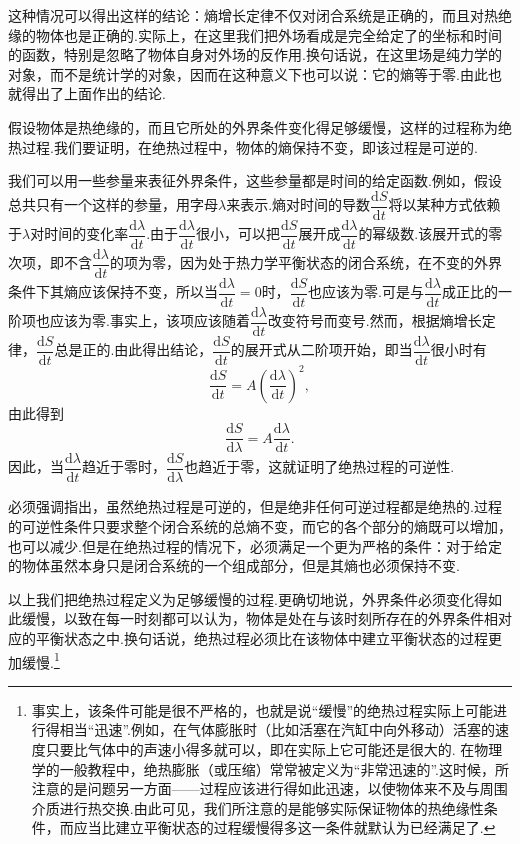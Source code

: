 这种情况可以得出这样的结论：熵增长定律不仅对闭合系统是正确的，而且对热绝缘的物体也是正确的.实际上，在这里我们把外场看成是完全给定了的坐标和时间的函数，特别是忽略了物体自身对外场的反作用.换句话说，在这里场是纯力学的对象，而不是统计学的对象，因而在这种意义下也可以说：它的熵等于零.由此也就得出了上面作出的结论.

假设物体是热绝缘的，而且它所处的外界条件变化得足够缓慢，这样的过程称为绝热过程.我们要证明，在绝热过程中，物体的熵保持不变，即该过程是可逆的.

我们可以用一些参量来表征外界条件，这些参量都是时间的给定函数.例如，假设总共只有一个这样的参量，用字母$\lambda$来表示.熵对时间的导数$\dfrac{\mathrm{d}S}{\mathrm{d}t}$将以某种方式依赖于$\lambda$对时间的变化率$\dfrac{\mathrm{d}\lambda}{\mathrm{d}t}$.由于$\dfrac{\mathrm{d}\lambda}{\mathrm{d}t}$很小，可以把$\dfrac{\mathrm{d}S}{\mathrm{d}t}$展开成$\dfrac{\mathrm{d}\lambda}{\mathrm{d}t}$的幂级数.该展开式的零次项，即不含$\dfrac{\mathrm{d}\lambda}{\mathrm{d}t}$的项为零，因为处于热力学平衡状态的闭合系统，在不变的外界条件下其熵应该保持不变，所以当$\dfrac{\mathrm{d}\lambda}{\mathrm{d}t}=0$时，$\dfrac{\mathrm{d}S}{\mathrm{d}t}$也应该为零.可是与$\dfrac{\mathrm{d}\lambda}{\mathrm{d}t}$成正比的一阶项也应该为零.事实上，该项应该随着$\dfrac{\mathrm{d}\lambda}{\mathrm{d}t}$改变符号而变号.然而，根据熵增长定律，$\dfrac{\mathrm{d}S}{\mathrm{d}t}$总是正的.由此得出结论，$\dfrac{\mathrm{d}S}{\mathrm{d}t}$的展开式从二阶项开始，即当$\dfrac{\mathrm{d}\lambda}{\mathrm{d}t}$很小时有
\begin{equation*}
  \frac{\mathrm{d}S}{\mathrm{d}t}
  =A\left(\frac{\mathrm{d}\lambda}{\mathrm{d}t}\right)^2,
\end{equation*}
由此得到
\begin{equation*}
  \frac{\mathrm{d}S}{\mathrm{d}\lambda}
  =A\frac{\mathrm{d}\lambda}{\mathrm{d}t}.
\end{equation*}
因此，当$\dfrac{\mathrm{d}\lambda}{\mathrm{d}t}$趋近于零时，$\dfrac{\mathrm{d}S}{\mathrm{d}\lambda}$也趋近于零，这就证明了绝热过程的可逆性.

必须强调指出，虽然绝热过程是可逆的，但是绝非任何可逆过程都是绝热的.过程的可逆性条件只要求整个闭合系统的总熵不变，而它的各个部分的熵既可以增加，也可以减少.但是在绝热过程的情况下，必须满足一个更为严格的条件：对于给定的物体虽然本身只是闭合系统的一个组成部分，但是其熵也必须保持不变.

以上我们把绝热过程定义为足够缓慢的过程.更确切地说，外界条件必须变化得如此缓慢，以致在每一时刻都可以认为，物体是处在与该时刻所存在的外界条件相对应的平衡状态之中.换句话说，绝热过程必须比在该物体中建立平衡状态的过程更加缓慢.\footnote{事实上，该条件可能是很不严格的，也就是说“缓慢”的绝热过程实际上可能进行得相当“迅速”.例如，在气体膨胀时（比如活塞在汽缸中向外移动）活塞的速度只要比气体中的声速小得多就可以，即在实际上它可能还是很大的.
在物理学的一般教程中，绝热膨胀（或压缩）常常被定义为“非常迅速的”.这时候，所注意的是问题另一方面——过程应该进行得如此迅速，以使物体来不及与周围介质进行热交换.由此可见，我们所注意的是能够实际保证物体的热绝缘性条件，而应当比建立平衡状态的过程缓慢得多这一条件就默认为已经满足了.}

